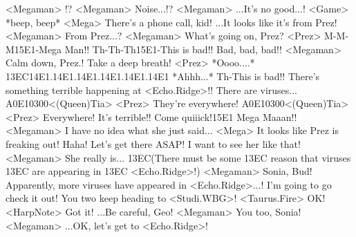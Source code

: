 <Megaman> !? 
<Megaman> Noise...!? 
<Megaman> ...It's no good...! 
<Game> *beep, beep* 
<Mega> There's a phone call, kid! 
...It looks like it's from Prez! 
<Megaman> From Prez...? 
<Megaman> What's going on, Prez? 
<Prez> M-M-M{15}{E1}-Mega Man!! 
Th-Th-Th{15}{E1}-This is bad!! 
Bad, bad, bad!! 
<Megaman> Calm down, Prez.! 
Take a deep breath! 
<Prez> *Oooo....* 
{13}{EC}{14}{E1}.{14}{E1}.{14}{E1}.{14}{E1}.{14}{E1}.{14}{E1} 
*Ahhh...* 
Th-This is bad!! 
There's something terrible happening at <Echo.Ridge>!! 
There are viruses... 
{A0}{E1}{03}{00}<(Queen)Tia> 
<Prez> They're everywhere! 
{A0}{E1}{03}{00}<(Queen)Tia> 
<Prez> Everywhere! 
It's terrible!! Come quiiick!{15}{E1} 
Mega Maaan!! 
<Megaman> I have no idea what she just said... 
<Mega> It looks like Prez is freaking out! 
Haha! 
Let's get there ASAP! I want to see her like that! 
<Megaman> She really is... 
{13}{EC}(There must be some {13}{EC} reason that viruses 
{13}{EC} are appearing in {13}{EC} <Echo.Ridge>!) 
<Megaman> Sonia, Bud! Apparently, more viruses have appeared in <Echo.Ridge>...! 
I'm going to go check it out! 
You two keep heading to <Studi.WBG>! 
<Taurus.Fire> OK! 
<HarpNote> Got it! 
...Be careful, Geo! 
<Megaman> You too, Sonia! 
<Megaman> ...OK, let's get to <Echo.Ridge>! 
